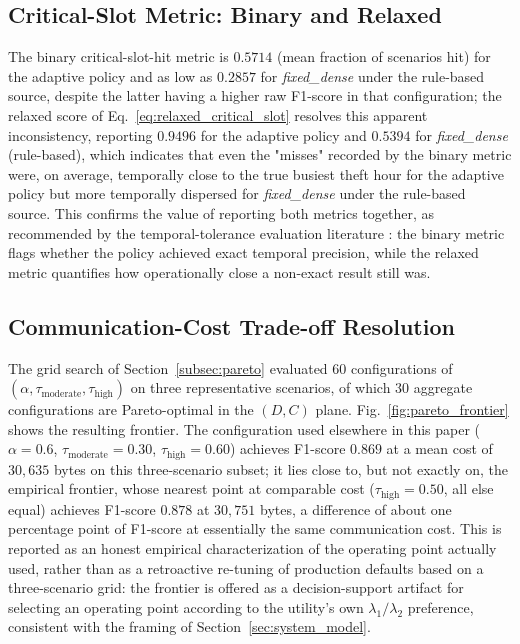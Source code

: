\documentclass{ieeeaccess}
\begin{document}
\subsection{Critical-Slot Metric: Binary and Relaxed}
The binary critical-slot-hit metric is $0.5714$ (mean fraction of scenarios hit) for the adaptive policy and as low as $0.2857$ for \textit{fixed\_dense} under the rule-based source, despite the latter having a higher raw F1-score in that configuration; the relaxed score of Eq.~\eqref{eq:relaxed_critical_slot} resolves this apparent inconsistency, reporting $0.9496$ for the adaptive policy and $0.5394$ for \textit{fixed\_dense} (rule-based), which indicates that even the "misses" recorded by the binary metric were, on average, temporally close to the true busiest theft hour for the adaptive policy but more temporally dispersed for \textit{fixed\_dense} under the rule-based source. This confirms the value of reporting both metrics together, as recommended by the temporal-tolerance evaluation literature \cite{b36,b37}: the binary metric flags whether the policy achieved exact temporal precision, while the relaxed metric quantifies how operationally close a non-exact result still was.

\subsection{Communication-Cost Trade-off Resolution}
\label{subsec:results_pareto}
The grid search of Section~\ref{subsec:pareto} evaluated 60 configurations of $(\alpha, \tau_{\text{moderate}}, \tau_{\text{high}})$ on three representative scenarios, of which 30 aggregate configurations are Pareto-optimal in the $(D, C)$ plane. Fig.~\ref{fig:pareto_frontier} shows the resulting frontier. The configuration used elsewhere in this paper ($\alpha = 0.6$, $\tau_{\text{moderate}} = 0.30$, $\tau_{\text{high}} = 0.60$) achieves F1-score $0.869$ at a mean cost of $30{,}635$ bytes on this three-scenario subset; it lies close to, but not exactly on, the empirical frontier, whose nearest point at comparable cost ($\tau_{\text{high}} = 0.50$, all else equal) achieves F1-score $0.878$ at $30{,}751$ bytes, a difference of about one percentage point of F1-score at essentially the same communication cost. This is reported as an honest empirical characterization of the operating point actually used, rather than as a retroactive re-tuning of production defaults based on a three-scenario grid: the frontier is offered as a decision-support artifact for selecting an operating point according to the utility's own $\lambda_1/\lambda_2$ preference, consistent with the framing of Section~\ref{sec:system_model}.
\end{document}
